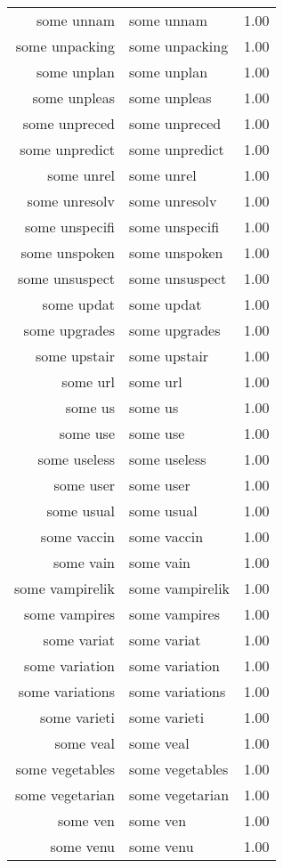 \begin{table}[ht]
\begin{tabular}{rlr}
  some unnam & some unnam & 1.00 \\ 
  some unpacking & some unpacking & 1.00 \\ 
  some unplan & some unplan & 1.00 \\ 
  some unpleas & some unpleas & 1.00 \\ 
  some unpreced & some unpreced & 1.00 \\ 
  some unpredict & some unpredict & 1.00 \\ 
  some unrel & some unrel & 1.00 \\ 
  some unresolv & some unresolv & 1.00 \\ 
  some unspecifi & some unspecifi & 1.00 \\ 
  some unspoken & some unspoken & 1.00 \\ 
  some unsuspect & some unsuspect & 1.00 \\ 
  some updat & some updat & 1.00 \\ 
  some upgrades & some upgrades & 1.00 \\ 
  some upstair & some upstair & 1.00 \\ 
  some url & some url & 1.00 \\ 
  some us & some us & 1.00 \\ 
  some use & some use & 1.00 \\ 
  some useless & some useless & 1.00 \\ 
  some user & some user & 1.00 \\ 
  some usual & some usual & 1.00 \\ 
  some vaccin & some vaccin & 1.00 \\ 
  some vain & some vain & 1.00 \\ 
  some vampirelik & some vampirelik & 1.00 \\ 
  some vampires & some vampires & 1.00 \\ 
  some variat & some variat & 1.00 \\ 
  some variation & some variation & 1.00 \\ 
  some variations & some variations & 1.00 \\ 
  some varieti & some varieti & 1.00 \\ 
  some veal & some veal & 1.00 \\ 
  some vegetables & some vegetables & 1.00 \\ 
  some vegetarian & some vegetarian & 1.00 \\ 
  some ven & some ven & 1.00 \\ 
  some venu & some venu & 1.00 \\ 

\end{tabular}
\end{table}
